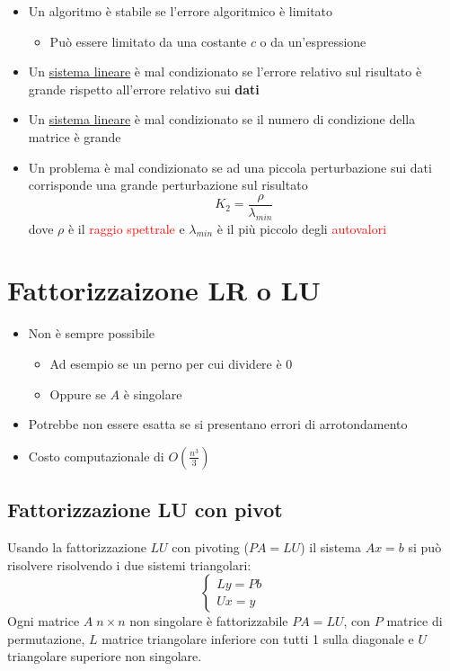 \documentclass{article}
\begin{document}
		\begin{itemize}
			\item Un algoritmo è stabile se l'errore algoritmico è limitato
			\begin{itemize}
				\item Può essere limitato da una costante $c$ o da un'espressione
			\end{itemize}
			\item Un \underline{sistema lineare} è mal condizionato se l'errore relativo sul risultato è grande rispetto all'errore relativo sui \textbf{dati}
			\item Un \underline{sistema lineare} è mal condizionato se il numero di condizione della matrice è grande
			\item Un problema è mal condizionato se ad una piccola perturbazione sui dati corrisponde una grande perturbazione sul risultato
			\[
				K_2 = \frac {\rho}{\lambda_{min}}
			\]
			dove $\rho$ è il \textcolor{red}{raggio spettrale} e $\lambda_{min}$ è il più piccolo degli \textcolor{red}{autovalori}
		\end{itemize}

	\section{Fattorizzaizone LR o LU}

		\begin{itemize}
			\item Non è sempre possibile
			\begin{itemize}
				\item Ad esempio se un perno per cui dividere è 0
				\item Oppure se $A$ è singolare
			\end{itemize}
			\item Potrebbe non essere esatta se si presentano errori di arrotondamento
			\item Costo computazionale di $O ( \frac{n^3}{3} )$
		\end{itemize}

	\subsection{Fattorizzazione LU con pivot}

		Usando la fattorizzazione $LU$ con pivoting ($PA = LU$) il sistema $A x = b$ si può risolvere risolvendo i due sistemi triangolari:
		\[
		\begin{cases}
		  L y = P b \\
		  U x = y
		\end{cases}
		\]
		Ogni matrice $A \; n \times n$ non singolare è fattorizzabile $PA = LU$, con $P$ matrice di permutazione, $L$ matrice triangolare inferiore con tutti 1 sulla diagonale e $U$ triangolare superiore non singolare.
\end{document}
